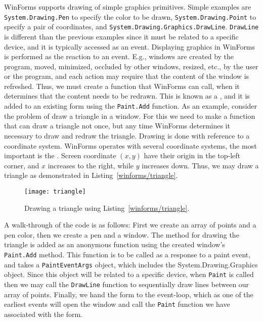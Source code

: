 WinForms supports drawing of simple graphics primitives. Simple examples are \lstinline!System.Drawing.Pen! to specify the color to be drawn, \lstinline!System.Drawing.Point! to specify a pair of coordinates, and \lstinline!System.Drawing.Graphics.DrawLine!. \lstinline!DrawLine! is different than the previous examples since it must be related to a specific device, and it is typically accessed as an event. Displaying graphics in WinForms is performed as the reaction to an event. E.g., windows are created by the program, moved, minimized, occluded by other windows, resized, etc., by the user or the program, and each action may require that the content of the window is refreshed. Thus, we must create a function that WinForms can call, when it determines that the content needs to be redrawn. This is known as a , and it is added to an existing form using the \lstinline!Paint.Add! function. As an example, consider the problem of draw a triangle in a window. For this we need to make a function that can draw a triangle not once, but any time WinForms determines it necessary to draw and redraw the triangle. Drawing is done with reference to a coordinate system. WinForms operates with several coordinate systems, the most important is the . Screen coordinate $(x,y)$ have their origin in the top-left corner, and $x$ increases to the right, while $y$ increases down. Thus, we may draw a triangle as demonstrated in Listing~\ref{winforms/triangle}.
%
%
\begin{figure}
  \centering
  \texttt{[image: triangle]}
  \caption{Drawing a triangle using Listing~\ref{winforms/triangle}.}
  \label{fig:triangle}
\end{figure}
A walk-through of the code is as follows: First we create an array of points and a pen color, then we create a pen and a window. The method for drawing the triangle is added as an anonymous function using the created window's \lstinline!Paint.Add! method. This function is to be called as a response to a paint event, and takes a \lstinline!PaintEventArgs! object, which includes the System.Drawing.Graphics object. Since this object will be related to a specific device, when \lstinline!Paint! is called then we may call the \lstinline!DrawLine! function to sequentially draw lines between our array of points. Finally, we hand the form to the event-loop, which as one of the earliest events will open the window and call the \lstinline!Paint! function we have associated with the form.

